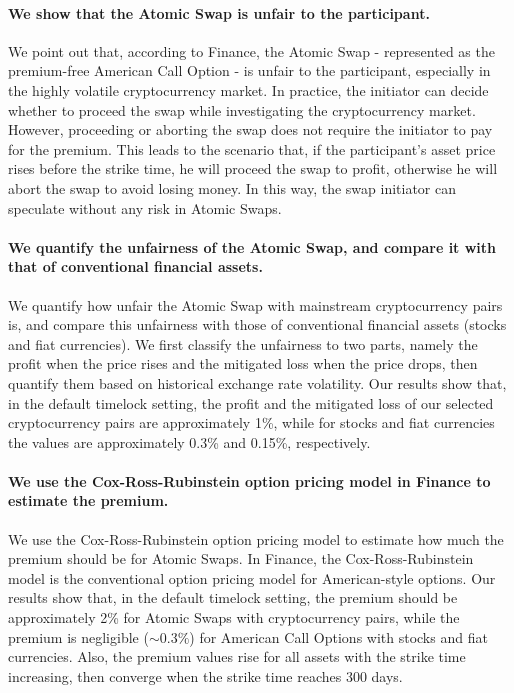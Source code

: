 \paragraph{We show that the Atomic Swap is unfair to the participant.}
We point out that, according to Finance, the Atomic Swap - represented as the premium-free American Call Option - is unfair to the participant, especially in the highly volatile cryptocurrency market.
In practice, the initiator can decide whether to proceed the swap while investigating the cryptocurrency market.
However, proceeding or aborting the swap does not require the initiator to pay for the premium.
This leads to the scenario that, if the participant's asset price rises before the strike time, he will proceed the swap to profit, otherwise he will abort the swap to avoid losing money.
In this way, the swap initiator can speculate without any risk in Atomic Swaps.

\paragraph{We quantify the unfairness of the Atomic Swap, and compare it with that of conventional financial assets.}
We quantify how unfair the Atomic Swap with mainstream cryptocurrency pairs is, and compare this unfairness with those of conventional financial assets (stocks and fiat currencies).
We first classify the unfairness to two parts, namely the profit when the price rises and the mitigated loss when the price drops, then quantify them based on historical exchange rate volatility.
Our results show that, in the default timelock setting, the profit and the mitigated loss of our selected cryptocurrency pairs are approximately 1\%, while for stocks and fiat currencies the values are approximately 0.3\% and 0.15\%, respectively.

\paragraph{We use the Cox-Ross-Rubinstein option pricing model in Finance to estimate the premium.}
We use the Cox-Ross-Rubinstein option pricing model to estimate how much the premium should be for Atomic Swaps.
In Finance, the Cox-Ross-Rubinstein model\cite{cox1979option} is the conventional option pricing model for American-style options.
Our results show that, in the default timelock setting, the premium should be approximately 2\% for Atomic Swaps with cryptocurrency pairs, while the premium is negligible ($\sim 0.3\%$) for American Call Options with stocks and fiat currencies.
Also, the premium values rise for all assets with the strike time increasing, then converge when the strike time reaches 300 days.

